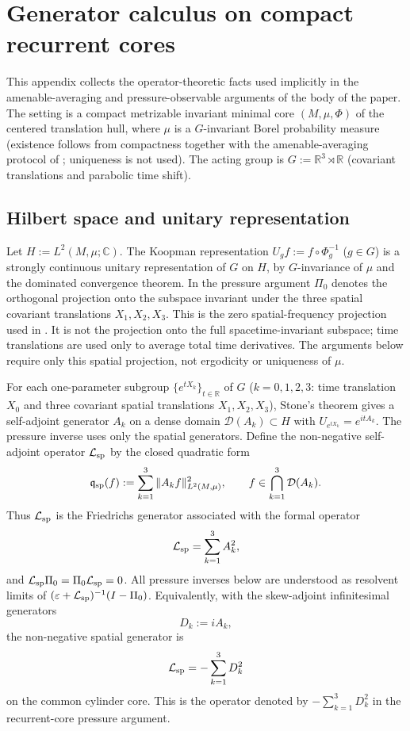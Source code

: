 \documentclass[11pt]{amsart}
\numberwithin{equation}{section}
\theoremstyle{plain}
\theoremstyle{definition}
\theoremstyle{remark}
\begin{document}
\section{Generator calculus on compact recurrent cores}
\label{app:generator-calculus}

This appendix collects the operator-theoretic facts used implicitly in the
amenable-averaging and pressure-observable arguments of the body of the
paper.  The setting is a compact metrizable invariant minimal core
\((M,\mu,\Phi)\) of the centered translation hull, where \(\mu\) is a
\(G\)-invariant Borel probability measure (existence follows from
compactness together with the amenable-averaging protocol of
; uniqueness is not
used).  The acting group is
\(G:=\mathbb R^3\rtimes\mathbb R\) (covariant translations and parabolic
time shift).

\subsection{Hilbert space and unitary representation}
Let \(H:=L^2(M,\mu;\mathbb C)\).  The Koopman representation
\(U_g f:=f\circ\Phi_g^{-1}\) (\(g\in G\)) is a strongly continuous unitary
representation of \(G\) on \(H\), by \(G\)-invariance of \(\mu\) and
the dominated convergence theorem.  In the pressure argument \(\Pi_0\) denotes
the orthogonal projection onto the subspace invariant under the three spatial
covariant translations \(X_1,X_2,X_3\).  This is the zero spatial-frequency
projection used in .  It is not the
projection onto the full spacetime-invariant subspace; time translations are
used only to average total time derivatives.  The arguments below require only
this spatial projection, not ergodicity or uniqueness of \(\mu\).

For each one-parameter subgroup \(\{e^{tX_k}\}_{t\in\mathbb R}\) of \(G\)
(\(k=0,1,2,3\): time translation \(X_0\) and three covariant spatial
translations \(X_1,X_2,X_3\)), Stone's theorem gives a self-adjoint
generator \(A_k\) on a dense domain \(\mathcal D(A_k)\subset H\) with
\(U_{e^{tX_k}}=e^{itA_k}\).  The pressure inverse uses only the spatial
generators.  Define the non-negative self-adjoint operator
\(\mathcal L_{\rm sp}\) by the closed quadratic form
\[
   \mathfrak q_{\rm sp}(f)
   :=
   \sum_{k=1}^3\|A_k f\|_{L^2(M,\mu)}^2,
   \qquad
   f\in\bigcap_{k=1}^3\mathcal D(A_k).
\]
Thus \(\mathcal L_{\rm sp}\) is the Friedrichs generator associated with the formal
operator
\[
   \mathcal L_{\rm sp}=\sum_{k=1}^3 A_k^2,
\]
and \(\mathcal L_{\rm sp}\Pi_0=\Pi_0\mathcal L_{\rm sp}=0\).  All pressure
inverses below are understood as resolvent limits of
\((\varepsilon+\mathcal L_{\rm sp})^{-1}(I-\Pi_0)\).
Equivalently, with the skew-adjoint infinitesimal generators
\[
   D_k:=iA_k ,
\]
the non-negative spatial generator is
\[
   \mathcal L_{\rm sp}=-\sum_{k=1}^3D_k^2
\]
on the common cylinder core.  This is the operator denoted by
\(-\sum_{k=1}^3D_k^2\) in the recurrent-core pressure argument.
\end{document}
